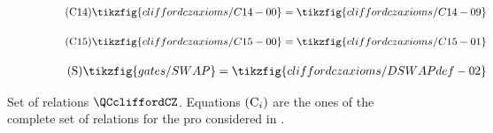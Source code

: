 \begin{figure}[ht]
{\begin{minipage}{.975\textwidth}
\begin{center}
\begin{subfigure}{.85\textwidth}
        \end{subfigure}
        \begin{subfigure}{.82\textwidth}
            \begin{align}\label{C14}\tag{C14}\tikzfig{cliffordczaxioms/C14-00}=\tikzfig{cliffordczaxioms/C14-09}\end{align}
        \end{subfigure}
        \begin{subfigure}{.82\textwidth}
            \begin{align}\label{C15}\tag{C15}\tikzfig{cliffordczaxioms/C15-00}=\tikzfig{cliffordczaxioms/C15-01}\end{align}
        \end{subfigure}
        \begin{subfigure}{.44\textwidth}
            \begin{align}\label{DSWAPdef}\tag{S}\tikzfig{gates/SWAP}=\tikzfig{cliffordczaxioms/DSWAPdef-02}\end{align}
        \end{subfigure}
    \end{center}\end{minipage}}
    \caption{Set of relations $\QCcliffordCZ$. Equations $(\textup{C}_i)$ are the ones of the complete set of relations for the pro considered in \cite{SelingerStabilizer}.}
    \label{appendix:oldgraphicallanguage1}
\end{figure}

